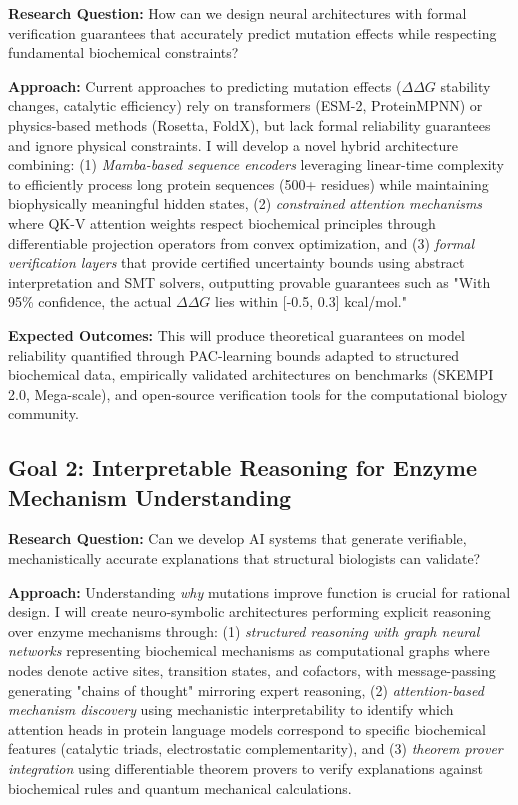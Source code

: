 \documentclass[11pt]{article}
\begin{document}
\textbf{Research Question:} How can we design neural architectures with formal
verification guarantees that accurately predict mutation effects while
respecting fundamental biochemical constraints?

\textbf{Approach:} Current approaches to predicting mutation effects ($\Delta
\Delta G$ stability changes, catalytic efficiency) rely on transformers (ESM-2,
ProteinMPNN) or physics-based methods (Rosetta, FoldX), but lack formal
reliability guarantees and ignore physical constraints. I will develop a novel
hybrid architecture combining: (1) \textit{Mamba-based sequence encoders}
leveraging linear-time complexity to efficiently process long protein sequences
(500+ residues) while maintaining biophysically meaningful hidden states, (2)
\textit{constrained attention mechanisms} where QK-V attention weights respect
biochemical principles through differentiable projection operators from convex
optimization, and (3) \textit{formal verification layers} that provide certified
uncertainty bounds using abstract interpretation and SMT solvers, outputting
provable guarantees such as "With 95\% confidence, the actual $\Delta \Delta G$ lies within
[-0.5, 0.3] kcal/mol."

\textbf{Expected Outcomes:} This will produce theoretical guarantees on model
reliability quantified through PAC-learning bounds adapted to structured
biochemical data, empirically validated architectures on benchmarks (SKEMPI 2.0,
Mega-scale), and open-source verification tools for the computational biology
community.

\subsection*{Goal 2: Interpretable Reasoning for Enzyme Mechanism Understanding}

\textbf{Research Question:} Can we develop AI systems that generate verifiable,
mechanistically accurate explanations that structural biologists can validate?

\textbf{Approach:} Understanding \textit{why} mutations improve function is
crucial for rational design. I will create neuro-symbolic architectures
performing explicit reasoning over enzyme mechanisms through: (1)
\textit{structured reasoning with graph neural networks} representing
biochemical mechanisms as computational graphs where nodes denote active sites,
transition states, and cofactors, with message-passing generating "chains of
thought" mirroring expert reasoning, (2) \textit{attention-based mechanism
discovery} using mechanistic interpretability to identify which attention heads
in protein language models correspond to specific biochemical features
(catalytic triads, electrostatic complementarity), and (3) \textit{theorem
prover integration} using differentiable theorem provers to verify explanations
against biochemical rules and quantum mechanical calculations.
\end{document}
